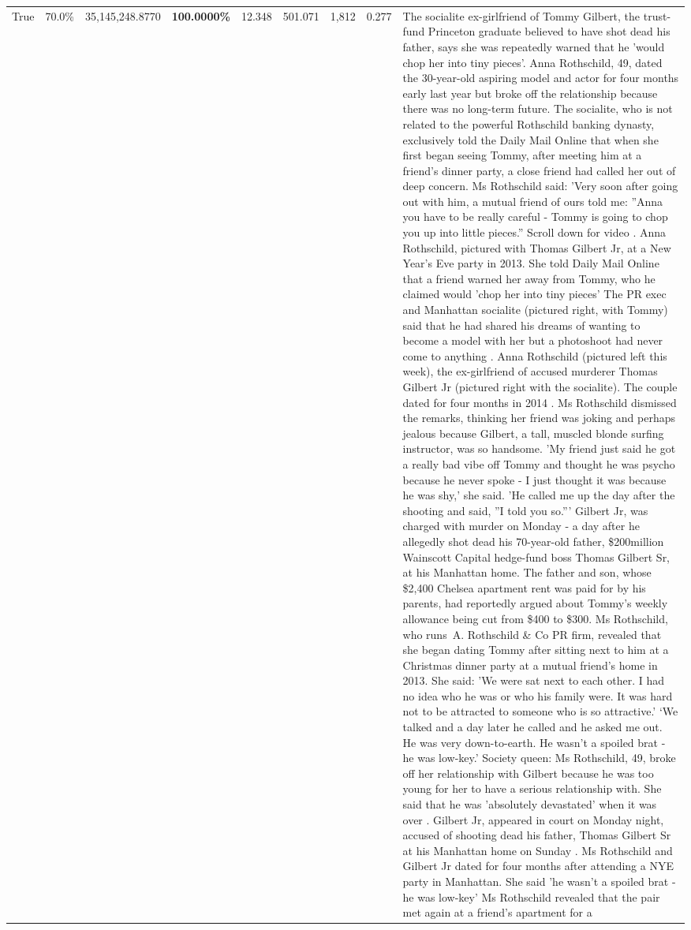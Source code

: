 \begin{table}[H]
\begin{tabular}{lllrlllll}
True & 70.0\% & 35,145,248.8770 & \bfseries \color{red} 100.0000\% & 12.348 & 501.071 & 1,812 & 0.277 & The socialite ex-girlfriend of Tommy Gilbert, the trust-fund Princeton graduate believed to have shot dead his father, says she was repeatedly warned that he 'would chop her into tiny pieces'. Anna Rothschild, 49, dated the 30-year-old aspiring model and actor for four months early last year but broke off the relationship because there was no long-term future. The socialite, who is not related to the powerful Rothschild banking dynasty, exclusively told the Daily Mail Online that when she first began seeing Tommy, after meeting him at a friend's dinner party, a close friend had called her out of deep concern. Ms Rothschild said: 'Very soon after going out with him, a mutual friend of ours told me: ''Anna you have to be really careful - Tommy is going to chop you up into little pieces.'' Scroll down for video . Anna Rothschild, pictured with Thomas Gilbert Jr, at a New Year's Eve party in 2013. She told Daily Mail Online that a friend warned her away from Tommy, who he claimed would 'chop her into tiny pieces' The PR exec and Manhattan socialite (pictured right, with Tommy) said that he had shared his dreams of wanting to become a model with her but a photoshoot had never come to anything . Anna Rothschild (pictured left this week), the ex-girlfriend of accused murderer Thomas Gilbert Jr (pictured right with the socialite). The couple dated for four months in 2014 . Ms Rothschild dismissed the remarks, thinking her friend was joking and perhaps jealous because Gilbert, a tall, muscled blonde surfing instructor, was so handsome. 'My friend just said he got a really bad vibe off Tommy and thought he was psycho because he never spoke - I just thought it was because he was shy,' she said. 'He called me up the day after the shooting and said, ''I told you so.''' Gilbert Jr, was charged with murder on Monday - a day after he allegedly shot dead his 70-year-old father, \$200million Wainscott Capital hedge-fund boss Thomas Gilbert Sr, at his Manhattan home. The father and son, whose \$2,400 Chelsea apartment rent was paid for by his parents, had reportedly argued about Tommy's weekly allowance being cut from \$400 to \$300. Ms Rothschild, who runs A. Rothschild \& Co PR firm, revealed that she began dating Tommy after sitting next to him at a Christmas dinner party at a mutual friend's home in 2013. She said: 'We were sat next to each other. I had no idea who he was or who his family were. It was hard not to be attracted to someone who is so attractive.' ‘We talked and a day later he called and he asked me out. He was very down-to-earth. He wasn’t a spoiled brat - he was low-key.’ Society queen: Ms Rothschild, 49, broke off her relationship with Gilbert because he was too young for her to have a serious relationship with. She said that he was 'absolutely devastated' when it was over . Gilbert Jr, appeared in court on Monday night, accused of shooting dead his father, Thomas Gilbert Sr at his Manhattan home on Sunday . Ms Rothschild and Gilbert Jr dated for four months after attending a NYE party in Manhattan. She said 'he wasn't a spoiled brat - he was low-key' Ms Rothschild revealed that the pair met again at a friend’s apartment for a 
\end{tabular}
\end{table}
